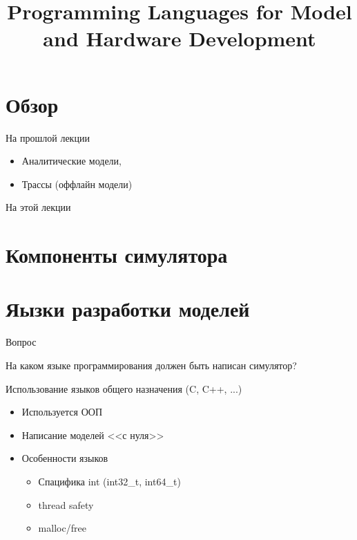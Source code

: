 
\title{Programming Languages for Model and Hardware Development}



\begin{frame}
\titlepage
\end{frame}

\section*{Обзор}

\begin{frame}{На прошлой лекции}

\begin{itemize}
  \item Аналитические модели,
  \item Трассы (оффлайн модели)
\end{itemize}

\end{frame}

\begin{frame}{На этой лекции}
\tableofcontents
\end{frame} 

\section{Компоненты симулятора}

\begin{frame}

\begin{figure}[htp]
    \centering
\end{figure}

\end{frame}

\section{Яызки разработки моделей}

\begin{frame}{Вопрос}

На каком языке программирования должен быть написан симулятор?

\end{frame}

\begin{frame}{Использование языков общего назначения (C, C++, ...)}

\begin{itemize}
  \item Используется ООП
  \item Написание моделей <<с нуля>>
  \item Особенности языков
  \begin{itemize}
    \item Спацифика int (int32\_t, int64\_t)
    \item thread safety
    \item malloc/free
  \end{itemize}
\end{itemize}

\end{frame}

